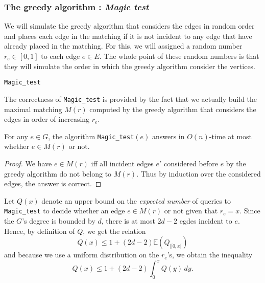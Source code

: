 \subsubsection{The greedy algorithm : \emph{Magic test}}

We will simulate the greedy algorithm that considers the edges in random order and places each edge in the matching if it is not incident to any edge that have already placed in the matching. For this, we will assigned a random number $r_e \in [0,1]$ to each edge $e \in E$. The whole point of these random numbers is that they will simulate the order in which the greedy algorithm consider the vertices. 

\begin{Algo}{\texttt{Magic\_test}}
\end{Algo}


The correctness of \texttt{Magic\_test} is provided by the fact that we actually build the maximal matching $M(r)$ computed by the greedy algorithm that considers the edges in order of increasing $r_e$.

\begin{lemma}
For any $e \in G$, the algorithm \texttt{Magic\_test}$(e)$ answers in $O(n)$-time at most whether $e \in M(r)$ or not.
\end{lemma}
\begin{proof}
We have $e \in M(r)$ iff all incident edges $e'$ considered before $e$ by the greedy algorithm do not belong to $M(r)$. Thus by induction over the considered edges, the answer is correct.
\end{proof}

Let $Q(x)$ denote an upper bound on the \emph{expected number} of queries to \texttt{Magic\_test} to decide whether an edge $e \in M(r)$ or not given that $r_e = x$. Since the $G$'s degree is bounded by $d$, there is at most $2d-2$ egdes incident to $e$. Hence, by definition of $Q$, we get the relation
\[
Q(x) \leq 1 + (2d-2)\mathbb{E}(Q_{|[0,x[})
\]
and because we use a uniform distribution on the $r_e$'s, we obtain the inequality
\[
Q(x) \leq 1 + (2d-2) \int_0^x Q(y)\,dy.
\]


